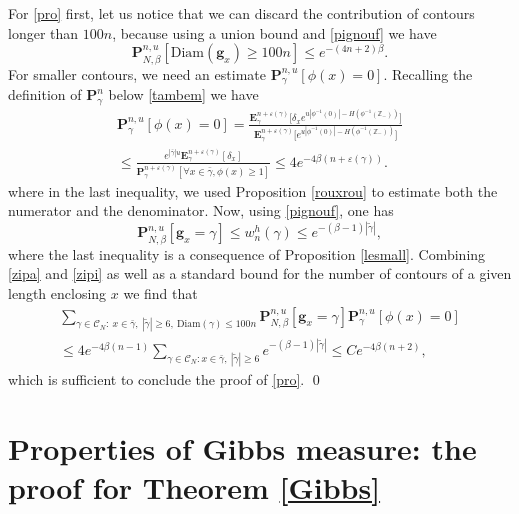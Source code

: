 \documentclass[JEP,XML,SOM,Unicode, NoFloatCountersInSection]{cedram}
\let\mathcal\mathscr
\numberwithin{equation}{section}
\theoremstyle{plain}
\theoremstyle{definition}
\newcommand{\bg}{\mathbf{g}}
\newcommand{\Diam}{\mathrm{Diam}}
\newcommand{\cC}{{\ensuremath{\mathcal C}} }
\newcommand{\bP}{{\ensuremath{\mathbf P}} }
\newcommand{\bE}{{\ensuremath{\mathbf E}} }
\newcommand{\bbZ}{{\ensuremath{\mathbb Z}} }
\newcommand{\gb}{\beta}
\newcommand{\gep}{\varepsilon}
\begin{document}
For \eqref{pro}
first, let us notice that we can discard the contribution of contours longer than $100 n$, because using a union bound and \eqref{pignouf} we have
\begin{equation*}
\bP^{n,u}_{N,\gb}\left[ \Diam(\bg_x)\ge 100 n \right]\le e^{-(4n+2)\gb}.
\end{equation*}
For smaller contours,
we need an estimate $\bP^{n,u}_{\gamma}\left[ \phi(x)=0\right]$.
Recalling the definition of $\bP^{n}_{\gamma}$ below \eqref{tambem} we have\vspace*{-3pt}\enlargethispage{.5\baselineskip}%
\begin{multline}\label{zipa}
\bP^{n,u}_{\gamma}\left[ \phi(x)=0\right]=
\frac{\bE^{n+\gep(\gamma)}_{\gamma}\bigl[\delta_x e^{u|\phi^{-1}(0)|-H(\phi^{-1}(\bbZ_-))} \bigr]}{\bE^{n+\gep(\gamma)}_{\gamma}\bigl[e^{u|\phi^{-1}(0)|-H(\phi^{-1}(\bbZ_-))} \bigr]}
\\
\le \frac{e^{|\bar \gamma| u}\bE^{n+\gep(\gamma)}_{\gamma}\left[\delta_x \right]}{\bP^{n+\gep(\gamma)}_{\gamma}[\forall x\in \bar \gamma, \phi(x)\ge 1]}
\le 4e^{- 4\gb(n+\gep(\gamma))}.
\end{multline}
where in the last inequality, we used Proposition \ref{rouxrou} to estimate both the numerator and the denominator.
Now, using \eqref{pignouf}, one has\vspace*{-3pt}
\begin{equation}\label{zipi}
\bP^{n,u}_{N,\gb}\left[ \bg_x=\gamma \right]\le w^h_n(\gamma) \le e^{-(\gb-1)|\tilde \gamma|},
\end{equation}
where the last inequality is a consequence of Proposition \ref{lesmall}.
Combining \eqref{zipa} and \eqref{zipi} as well as a standard bound for the number of contours of a given length enclosing $x$ we find that\vspace*{-3pt}
\begin{multline*}
\sum_{\gamma\in \cC_N: \ x\in \bar \gamma,\ |\tilde \gamma|\ge 6,\ \Diam(\gamma)\le 100 n}
\bP^{n,u}_{N,\gb}\left[ \bg_x=\gamma \right]\bP^{n,u}_{\gamma}\left[ \phi(x)=0\right]\\\le 4e^{- 4\gb(n-1)}
\sum_{\gamma\in \cC_N: x\in \bar \gamma,\ |\tilde \gamma|\ge 6}e^{-(\gb-1)|\tilde \gamma|}\le C e^{- 4\gb(n+2)},
\end{multline*}
which is sufficient to conclude the proof of \eqref{pro}.
\qed

\section{Properties of Gibbs measure: the proof for Theorem \ref{Gibbs}}\label{daverylast}
\end{document}

